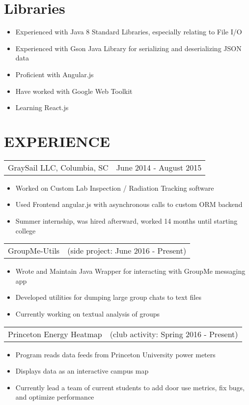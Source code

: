 \documentclass[margin]{res}
\begin{document}
\begin{resume}
\normalsize{\section{Libraries}}
    \begin{itemize} \itemsep -2pt
        \item Experienced with Java 8 Standard Libraries, especially relating to File I/O
        \item Experienced with Gson Java Library for serializing and deserializing JSON data
        \item Proficient with Angular.js
        \item Have worked with Google Web Toolkit
        \item Learning React.js
    \end{itemize}
 


\section{EXPERIENCE}      
    \begin{tabular}{p{3in} r} %
        GraySail LLC, Columbia, SC        & June 2014 - August 2015
    \end{tabular}
    \begin{itemize} \itemsep -2pt
        \item Worked on Custom Lab Inspection / Radiation Tracking software
        \item Used Frontend angular.js with asynchronous calls to custom ORM backend
        \item Summer internship, was hired afterward, worked 14 months until starting college
	\end{itemize}

	\begin{tabular}{p{3in} r}
        GroupMe-Utils & (side project: June 2016 - Present)
    \end{tabular}
    \begin{itemize} \itemsep -2pt
        \item Wrote and Maintain Java Wrapper for interacting with GroupMe messaging app
        \item Developed utilities for dumping large group chats to text files
        \item Currently working on textual analysis of groups
    \end{itemize}

    \begin{tabular}{p{3in} r}
        Princeton Energy Heatmap & (club activity: Spring 2016 - Present)
    \end{tabular}
    \begin{itemize} \itemsep -2pt
        \item Program reads data feeds from Princeton University power meters
        \item Displays data as an interactive campus map
        \item Currently lead a team of current students to add door use metrics, fix bugs, and optimize performance
    \end{itemize}


\end{resume}
\end{document}
